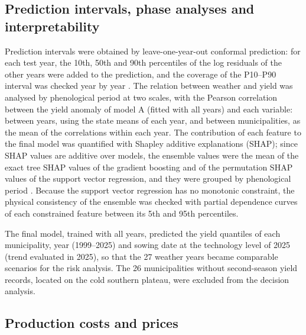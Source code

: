 \documentclass[10pt,a4paper]{article}
\begin{document}
\subsection{Prediction intervals, phase analyses and interpretability}
\label{subsec:interpret}

Prediction intervals were obtained by leave-one-year-out conformal prediction: for each test year, the
10th, 50th and 90th percentiles of the log residuals of the other years were added to the prediction,
and the coverage of the P10--P90 interval was checked year by year \citep{lei2018}. The relation between
weather and yield was analysed by phenological period at two scales, with the Pearson correlation
between the yield anomaly of model A (fitted with all years) and each variable: between years, using the
state means of each year, and between municipalities, as the mean of the correlations within each year.
The contribution of each feature to the final model was quantified with Shapley additive explanations
(SHAP); since SHAP values are additive over models, the ensemble values were the mean of the exact tree
SHAP values of the gradient boosting and of the permutation SHAP values of the support vector regression,
and they were grouped by phenological period \citep{lundberg2020}. Because the support vector regression
has no monotonic constraint, the physical consistency of the ensemble was checked with partial dependence
curves of each constrained feature between its 5th and 95th percentiles.

The final model, trained with all years, predicted the yield quantiles of each municipality, year
(1999--2025) and sowing date at the technology level of 2025 (trend evaluated in 2025), so that the 27
weather years became comparable scenarios for the risk analysis. The 26 municipalities without
second-season yield records, located on the cold southern plateau, were excluded from the decision
analysis.

\subsection{Production costs and prices}
\label{subsec:costs}
\end{document}
